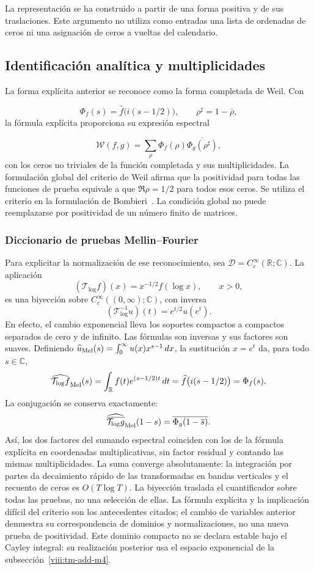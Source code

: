 La representación se ha construido a partir de una forma positiva y de sus traslaciones. Este argumento no utiliza como entradas una lista de ordenadas de ceros ni una asignación de ceros a vueltas del calendario.

\subsection{Identificación analítica y multiplicidades}
\label{viii:rz:identificacion}
La forma explícita anterior se reconoce como la forma completada de Weil. Con

\[
\Phi_f(s)=\widehat f\bigl(i(s-1/2)\bigr),
\qquad \rho^\sharp=1-\overline\rho,
\]
la fórmula explícita proporciona su expresión espectral

\[
\mathscr W(f,g)=\sum_\rho
\Phi_f(\rho)\overline{\Phi_g(\rho^\sharp)},
\]
con los ceros no triviales de la función completada y sus multiplicidades.
La formulación global del criterio de Weil afirma que la positividad para
todas las funciones de prueba equivale a que \(\Re\rho=1/2\) para todos
esos ceros. Se utiliza el criterio en la formulación de
Bombieri~\cite{viii:bombieri2000}. La condición global no puede reemplazarse
por positividad de un número finito de matrices.

\subsubsection*{Diccionario de pruebas Mellin--Fourier}
\label{viii:rz:mellin-fourier}
Para explicitar la normalización de ese reconocimiento, sea
\(\mathcal D=C_c^\infty(\mathbb R;\mathbb C)\). La aplicación
\[
 (\mathcal T_{\log}f)(x)=x^{-1/2}f(\log x),\qquad x>0,
\]
es una biyección sobre \(C_c^\infty((0,\infty);\mathbb C)\), con inversa
\[
 (\mathcal T_{\log}^{-1}u)(t)=e^{t/2}u(e^t).
\]
En efecto, el cambio exponencial lleva los soportes compactos a compactos
separados de cero y de infinito. Las fórmulas son inversas y sus factores
son suaves. Definiendo
\(\widehat u_{\rm Mel}(s)=\int_0^\infty u(x)x^{s-1}\,dx\),
la sustitución \(x=e^t\) da, para todo \(s\in\mathbb C\),
\[
 \widehat{\mathcal T_{\log}f}_{\rm Mel}(s)
 =\int_{\mathbb R}f(t)e^{(s-1/2)t}\,dt
 =\widehat f\bigl(i(s-1/2)\bigr)=\Phi_f(s).
\]
La conjugación se conserva exactamente:
\[
 \widehat{\overline{\mathcal T_{\log}g}}_{\rm Mel}(1-s)
 =\overline{\Phi_g(1-\overline s)}.
\]
Así, los dos factores del sumando espectral coinciden con los de la
fórmula explícita en coordenadas multiplicativas, sin factor residual
y contando las mismas multiplicidades. La suma converge absolutamente:
la integración por partes da decaimiento rápido de las transformadas
en bandas verticales y el recuento de ceros es \(O(T\log T)\).
La biyección traslada el cuantificador sobre todas las pruebas, no una
selección de ellas. La fórmula explícita y la implicación difícil del
criterio son los antecedentes citados; el cambio de variables anterior
demuestra su correspondencia de dominios y normalizaciones, no una nueva
prueba de positividad. Este dominio compacto no se declara estable bajo
el Cayley integral: su realización posterior usa el espacio exponencial
de la subsección~\ref{viii:tm-add-m4}.


